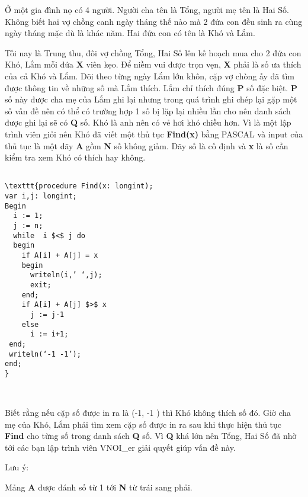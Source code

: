Ở một gia đình nọ có 4 người. Người cha tên là Tổng, người mẹ tên là Hai Số. Không biết hai vợ chồng canh ngày tháng thế nào mà 2 đứa con đều sinh ra cùng ngày tháng mặc dù là khác năm. Hai đứa con có tên là Khó và Lắm.

Tối nay là Trung thu, đôi vợ chồng Tổng, Hai Số lên kế hoạch mua cho 2 đứa con Khó, Lắm mỗi đứa \textbf{ X } viên kẹo. Để niềm vui được trọn vẹn, \textbf{ X } phải là số ưa thích của cả Khó và Lắm. Dõi theo từng ngày Lắm lớn khôn, cặp vợ chòng ấy đã tìm được thông tin về những số mà Lắm thích. Lắm chỉ thích đúng \textbf{ P } số đặc biệt. \textbf{ P } số này được cha mẹ của Lắm ghi lại nhưng trong quá trình ghi chép lại gặp một số vấn đề nên có thể có trường hợp 1 số bị lặp lại nhiều lần cho nên danh sách được ghi lại sẽ có \textbf{ Q } số. Khó là anh nên có vẻ hơi khó chiều hơn. Vì là một lập trình viên giỏi nên Khó đã viết một thủ tục \textbf{ Find(x) } bằng PASCAL và input của thủ tục là một dãy \textbf{ A } gồm \textbf{ N } số không giảm. Dãy số là cố định và \textbf{ x } là số cần kiểm tra xem Khó có thích hay không.
\begin{verbatim}

\texttt{procedure Find(x: longint);
var i,j: longint;
Begin
  i := 1;
  j := n;
  while  i $<$ j do
  begin 
    if A[i] + A[j] = x 
    begin
      writeln(i,’ ‘,j); 
      exit;
    end; 
    if A[i] + A[j] $>$ x
      j := j-1
    else 
      i := i+1;
 end;
 writeln(‘-1 -1’);
end;
}\end{verbatim}

 

Biết rằng nếu cặp số được in ra là (-1, -1 ) thì Khó không thích số đó. Giờ cha mẹ của Khó, Lắm phải tìm xem cặp số được in ra sau khi thực hiện thủ tục \textbf{ Find } cho từng số trong danh sách \textbf{ Q } số. Vì \textbf{ Q } khá lớn nên Tổng, Hai Số đã nhờ tới các bạn lập trình viên VNOI\_er giải quyết giúp vấn đề này.

Lưu ý:

Mảng \textbf{ A } được đánh số từ 1 tới \textbf{ N } từ trái sang phải.